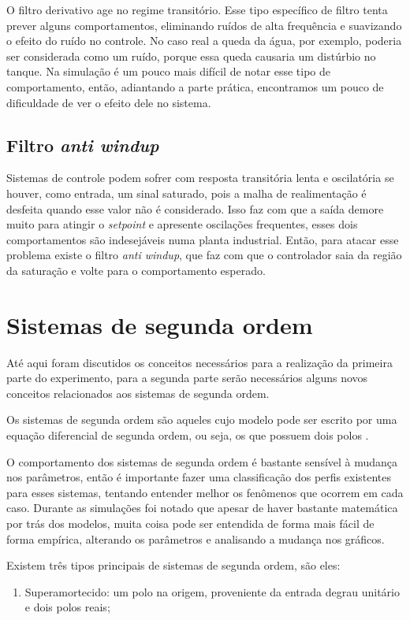 \documentclass[
	12pt,				%
	openany,			%
	oneside,			%
	a4paper,			%
	english,			%
	french,				%
	spanish,			%
	brazil,				%
	]{abntex2}
\begin{document}
{O filtro derivativo age no regime transitório. Esse tipo específico de filtro tenta prever alguns comportamentos, eliminando ruídos de alta frequência e suavizando o efeito do ruído no controle. No caso real a queda da água, por exemplo, poderia ser considerada como um ruído, porque essa queda causaria um distúrbio no tanque. Na simulação é um pouco mais difícil de notar esse tipo de comportamento, então, adiantando a parte prática, encontramos um pouco de dificuldade de ver o efeito dele no sistema.

\subsection{Filtro \textit{anti windup}}

Sistemas de controle podem sofrer com resposta transitória lenta e oscilatória se houver, como entrada, um sinal saturado, pois a malha de realimentação é desfeita quando esse valor não é considerado. Isso faz com que a saída demore muito para atingir o \textit{setpoint} e apresente oscilações frequentes, esses dois comportamentos são indesejáveis numa planta industrial. Então, para atacar esse problema existe o filtro \textit{anti windup}, que faz com que o controlador saia da região da saturação e volte para o comportamento esperado.

\section{Sistemas de segunda ordem}

Até aqui foram discutidos os conceitos necessários para a realização da primeira parte do experimento, para a segunda parte serão necessários alguns novos conceitos relacionados aos sistemas de segunda ordem. 

Os sistemas de segunda ordem são aqueles cujo modelo pode ser escrito por uma equação diferencial de segunda ordem, ou seja, os que possuem dois polos \cite{dan_madeira}.

O comportamento dos sistemas de segunda ordem é bastante sensível à mudança nos parâmetros, então é importante fazer uma classificação dos perfis existentes para esses sistemas, tentando entender melhor os fenômenos que ocorrem em cada caso. Durante as simulações foi notado que apesar de haver bastante matemática por trás dos modelos, muita coisa pode ser entendida de forma mais fácil de forma empírica, alterando os parâmetros e analisando a mudança nos gráficos.

Existem três tipos principais de sistemas de segunda ordem, são eles:
\begin{enumerate}
	\item Superamortecido: um polo na origem, proveniente da entrada degrau unitário e dois polos reais;
	

\end{enumerate}}
\end{document}
